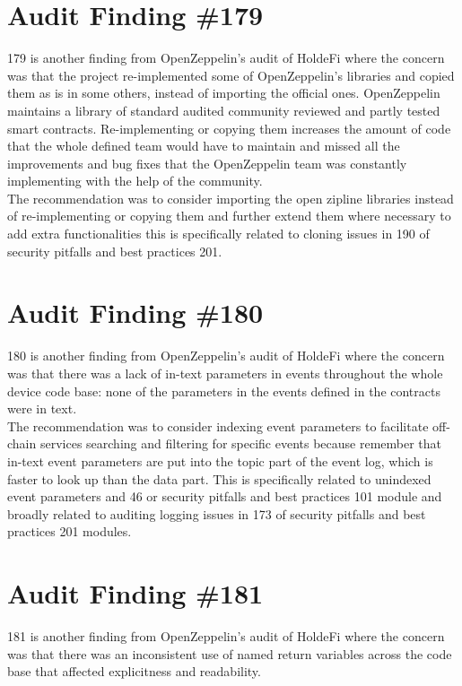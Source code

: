\section{Audit Finding \#179}

179 is another finding from OpenZeppelin's audit of HoldeFi where the concern was that the project re-implemented some of OpenZeppelin's libraries and copied them as is in some others, instead of importing the official ones. OpenZeppelin maintains a library of standard audited community reviewed and partly tested smart contracts. Re-implementing or copying them increases the amount of code that the whole defined team would have to maintain and missed all the improvements and bug fixes that the OpenZeppelin team was constantly implementing with the help of the community.\\

The recommendation was to consider importing the open zipline libraries instead of re-implementing or copying them and further extend them where necessary to add extra functionalities this is specifically related to cloning issues in 190 of security pitfalls and best practices 201.

\section{Audit Finding \#180}

180 is another finding from OpenZeppelin's audit of HoldeFi where the concern was that there was a lack of in-text parameters in events throughout the whole device code base: none of the parameters in the events defined in the contracts were in text.\\

The recommendation was to consider indexing event parameters to facilitate off-chain services searching and filtering for specific events because remember that in-text event parameters are put into the topic part of the event log, which is faster to look up than the data part. This is specifically related to unindexed event parameters and 46 or security pitfalls and best practices 101 module and broadly related to auditing logging issues in 173 of security pitfalls and best practices 201 modules.

\section{Audit Finding \#181}

181 is another finding from OpenZeppelin's audit of HoldeFi where the concern was that there was an inconsistent use of named return variables across the code base that affected explicitness and readability.\\

